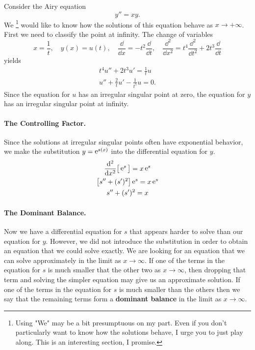 \begin{Example}
  Consider the Airy equation
  \[ y'' = x y. \]
  We
  \footnote{Using "We" may be a bit presumptuous on my part. Even if
    you don't particularly want to know how the solutions behave, I urge
    you to just play along.  This is an interesting section, I promise.}
  would like to know how the solutions of this equation behave as
  $x \to + \infty$.
  First we need to classify the point at infinity.  The change of variables
  \[ x = \frac{1}{t}, \quad y(x) = u(t), \quad \frac{\dd}{\dd x} = -t^2\frac{\dd}{\dd t},
  \quad \frac{\dd^2}{\dd x^2} = t^4 \frac{\dd^2}{\dd t^2} + 2t^3 \frac{\dd}{\dd t}\]
  yields
  \begin{gather*}
    t^4 u'' + 2 t^3 u' = \frac{1}{t} u \\
    u'' + \frac{2}{t} u' - \frac{1}{t^5} u = 0.
  \end{gather*}
  Since the equation for $u$ has an irregular singular point at zero, the equation for 
  $y$ has an irregular singular point at infinity.

  \paragraph{The Controlling Factor.}
  Since the solutions at irregular singular points often have exponential behavior, we
  make the substitution $y = \mathop{\mathrm{e}}\nolimits^{s(x)}$ into the differential equation for $y$.
  \begin{gather*}
    \frac{\mathrm{d}^2}{\mathrm{d} x^2} \big[ \mathop{\mathrm{e}}\nolimits^s \big] = x \mathop{\mathrm{e}}\nolimits^s \\
    \big[s'' + (s')^2\big] \mathop{\mathrm{e}}\nolimits^s = x \mathop{\mathrm{e}}\nolimits^s \\
    s'' + (s')^2 = x
  \end{gather*}

  \paragraph{The Dominant Balance.}
  Now we have a differential equation for $s$ that appears harder to solve than our equation
  for $y$.  However, we did not introduce the substitution in order to obtain an equation 
  that we could solve exactly.  We are looking for an equation that we can solve
  approximately in the limit as $x \to \infty$.  If one of the terms in the equation for
  $s$ is much smaller that the other two as $x \to \infty$, then dropping that term and solving
  the simpler equation may give us an approximate solution.  If one of the terms in the 
  equation for $s$ is much smaller than the others then we say that the remaining
  terms form a \textbf{dominant balance} in the limit as $x \to \infty$.


\end{Example}
